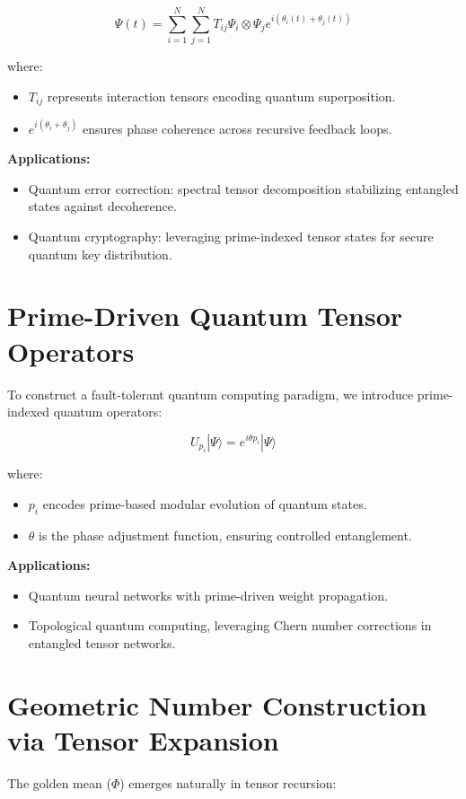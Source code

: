 \documentclass{article}
\theoremstyle{plain}
\begin{document}
\begin{equation}
\Psi(t) = \sum_{i=1}^{N} \sum_{j=1}^{N} T_{ij} \Psi_i \otimes \Psi_j e^{i(\theta_i(t) + \theta_j(t))}
\end{equation}

where:
\begin{itemize}
    \item \( T_{ij} \) represents interaction tensors encoding quantum superposition.
    \item \( e^{i(\theta_i + \theta_j)} \) ensures phase coherence across recursive feedback loops.
\end{itemize}

\textbf{Applications:}
\begin{itemize}
    \item Quantum error correction: spectral tensor decomposition stabilizing entangled states against decoherence.
    \item Quantum cryptography: leveraging prime-indexed tensor states for secure quantum key distribution.
\end{itemize}

\section{Prime-Driven Quantum Tensor Operators}
To construct a fault-tolerant quantum computing paradigm, we introduce prime-indexed quantum operators:

\begin{equation}
U_{p_i} |\Psi\rangle = e^{i \theta p_i} |\Psi\rangle
\end{equation}

where:
\begin{itemize}
    \item \( p_i \) encodes prime-based modular evolution of quantum states.
    \item \( \theta \) is the phase adjustment function, ensuring controlled entanglement.
\end{itemize}

\textbf{Applications:}
\begin{itemize}
    \item Quantum neural networks with prime-driven weight propagation.
    \item Topological quantum computing, leveraging Chern number corrections in entangled tensor networks.
\end{itemize}

\section{Geometric Number Construction via Tensor Expansion}
The golden mean (\(\Phi\)) emerges naturally in tensor recursion:
\end{document}

